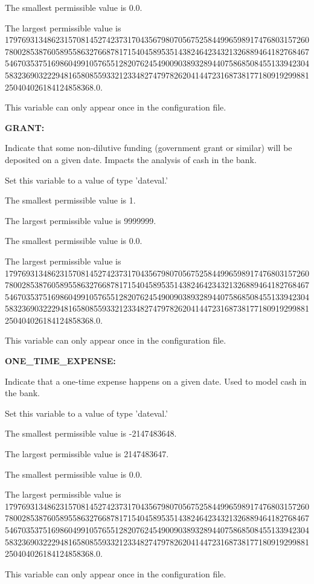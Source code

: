 The smallest permissible value is 0.0.

The largest permissible value is 179769313486231570814527423731704356798070567525844996598917476803157260780028538760589558632766878171540458953514382464234321326889464182768467546703537516986049910576551282076245490090389328944075868508455133942304583236903222948165808559332123348274797826204144723168738177180919299881250404026184124858368.0.

This variable can only appear once in the configuration file.


\textbf{GRANT:}


Indicate that some non-dilutive funding (government grant or similar) will be deposited on a given date.  Impacts the analysis of cash in the bank.

Set this variable to a value of type 'dateval.'

The smallest permissible value is 1.

The largest permissible value is 9999999.

The smallest permissible value is 0.0.

The largest permissible value is 179769313486231570814527423731704356798070567525844996598917476803157260780028538760589558632766878171540458953514382464234321326889464182768467546703537516986049910576551282076245490090389328944075868508455133942304583236903222948165808559332123348274797826204144723168738177180919299881250404026184124858368.0.

This variable can only appear once in the configuration file.


\textbf{ONE\_TIME\_EXPENSE:}


Indicate that a one-time expense happens on a given date.  Used to model cash in the bank.

Set this variable to a value of type 'dateval.'

The smallest permissible value is -2147483648.

The largest permissible value is 2147483647.

The smallest permissible value is 0.0.

The largest permissible value is 179769313486231570814527423731704356798070567525844996598917476803157260780028538760589558632766878171540458953514382464234321326889464182768467546703537516986049910576551282076245490090389328944075868508455133942304583236903222948165808559332123348274797826204144723168738177180919299881250404026184124858368.0.

This variable can only appear once in the configuration file.


